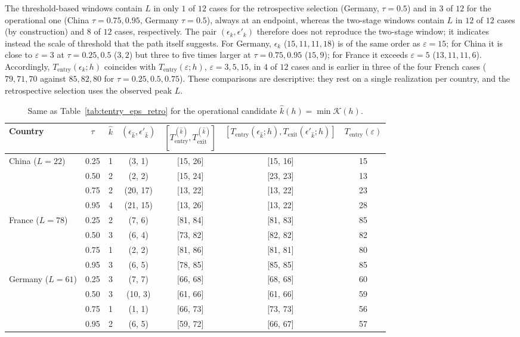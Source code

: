 \documentclass[12pt,a4paper]{article}
\begin{document}
The threshold-based windows contain $L$ in only $1$ of $12$ cases for the
retrospective selection (Germany, $\tau=0.5$) and in $3$ of $12$ for the
operational one (China $\tau=0.75,0.95$, Germany $\tau=0.5$), always at an
endpoint, whereas the two-stage windows contain $L$ in $12$ of $12$ cases
(by construction) and $8$ of $12$ cases, respectively. The pair
$(\epsilon_k,\epsilon'_k)$ therefore does not reproduce the two-stage
window; it indicates instead the scale of threshold that the path itself
suggests. For Germany, $\epsilon_k$ ($15,11,11,18$) is of the same order as
$\varepsilon=15$; for China it is close to $\varepsilon=3$ at
$\tau=0.25,0.5$ ($3,2$) but three to five times larger at
$\tau=0.75,0.95$ ($15,9$); for France it exceeds $\varepsilon=5$
($13,11,11,6$). Accordingly, $T_{\mathrm{entry}}(\epsilon_k;h)$ coincides
with $T_{\mathrm{entry}}(\varepsilon;h)$, $\varepsilon=3,5,15$, in $4$ of
$12$ cases and is earlier in three of the four French cases
($79,71,70$ against $85,82,80$ for $\tau=0.25,0.5,0.75$). These
comparisons are descriptive: they rest on a single realization per
country, and the retrospective selection uses the observed peak $L$.

\begin{table}[htbp]
	\centering
	\small
	\caption{Same as Table~\ref{tab:tentry_eps_retro} for the operational
		candidate $\hat k(h)=\min\mathcal K(h)$.}
	\label{tab:tentry_eps_oper}
	\begin{tabular}{lccccc c}
		\toprule
		Country & $\tau$ & $\hat k$ & $(\epsilon_{\hat k},\epsilon'_{\hat k})$
		& $[T_{\mathrm{entry}}^{(\hat k)},T_{\mathrm{exit}}^{(\hat k)}]$
		& $[T_{\mathrm{entry}}(\epsilon_{\hat k};h),T_{\mathrm{exit}}(\epsilon'_{\hat k};h)]$
		& $T_{\mathrm{entry}}(\varepsilon)$ \\
		\midrule
		China ($L=22$)    & 0.25 & 1 & (3, 1)   & [15, 26] & [15, 16] & 15 \\
		& 0.50 & 2 & (2, 2)   & [15, 24] & [23, 23] & 13 \\
		& 0.75 & 2 & (20, 17) & [13, 22] & [13, 22] & 23 \\
		& 0.95 & 4 & (21, 15) & [13, 26] & [13, 22] & 28 \\
		\midrule
		France ($L=78$)   & 0.25 & 2 & (7, 6)   & [81, 84] & [81, 83] & 85 \\
		& 0.50 & 3 & (6, 4)   & [73, 82] & [82, 82] & 82 \\
		& 0.75 & 1 & (2, 2)   & [81, 86] & [81, 81] & 80 \\
		& 0.95 & 3 & (6, 5)   & [78, 85] & [85, 85] & 85 \\
		\midrule
		Germany ($L=61$)  & 0.25 & 3 & (7, 7)   & [66, 68] & [68, 68] & 60 \\
		& 0.50 & 3 & (10, 3)  & [61, 66] & [61, 66] & 59 \\
		& 0.75 & 1 & (1, 1)   & [66, 73] & [73, 73] & 56 \\
		& 0.95 & 2 & (6, 5)   & [59, 72] & [66, 67] & 57 \\
		\bottomrule
	\end{tabular}
\end{table}
\end{document}
